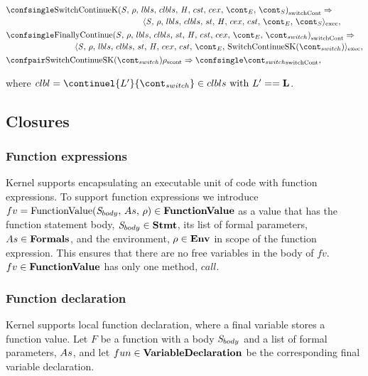 \documentclass[a4paper,oneside]{article}
\newcommand{\cesktrans}[2]{\ensuremath{{#1} \Rightarrow {#2}}}
\newcommand{\cesktranssplit}[2]{\ensuremath{{#1} \Rightarrow\\ {#2}}}
\begin{document}
\begin{align*}
    &\begin{multlined}
        \cesktranssplit%
            {\switchconf{\ContinueK}}%
            {\execconf{\stmt}{\env}{\lbls}{\clbls}{\handler}{\cex}{\cstrace}{\econt}{\scont}},
    \end{multlined}\\
    &\begin{multlined}
        \cesktranssplit%
            {\switchconf{\FinallyContinue{\stmt}{\switchcont}}}%
            {\execconf{\stmt}{\env}{\lbls}{\clbls}{\handler}{\cex}{\cstrace}{\econt}{\mathrm{SwitchContinueSK}(\switchcont)}},
    \end{multlined}\\
    &\cesktrans%
        {\scontconf{\mathrm{SwitchContinueSK}(\switchcont)}{\env}}%
        {\switchconf{\switchcont}},
\end{align*}

\noindent where $\clbl = \continuel{L'}{\switchcont} \in \clbls \text{ with } L' == \mathbf{L}$.


\subsection{Closures}


\subsubsection{Function expressions}

Kernel supports encapsulating an executable unit of code with function expressions.
To support function expressions we introduce $fv = \mathrm{FunctionValue}({\mathit{S}_{body}},\,{As},\,{\rho}) \in \mathbf{FunctionValue}$ as a value that has the function statement body, $\mathit{S}_{body} \in \mathbf{Stmt}$, its list of formal parameters, $As \in \mathbf{Formals}$, and the environment, $\rho \in \mathbf{Env}$ in scope of the function expression.
This ensures that there are no free variables in the body of $fv$.
$fv \in \mathbf{FunctionValue}$ has only one method, $call$.


\subsubsection{Function declaration}

Kernel supports local function declaration, where a final variable stores a function value.
Let $F$ be a function with a body $\mathit{S}_{body}$ and a list of formal parameters, $As$, and let $fun \in \mathbf{VariableDeclaration}$ be the corresponding final variable declaration.
\end{document}
